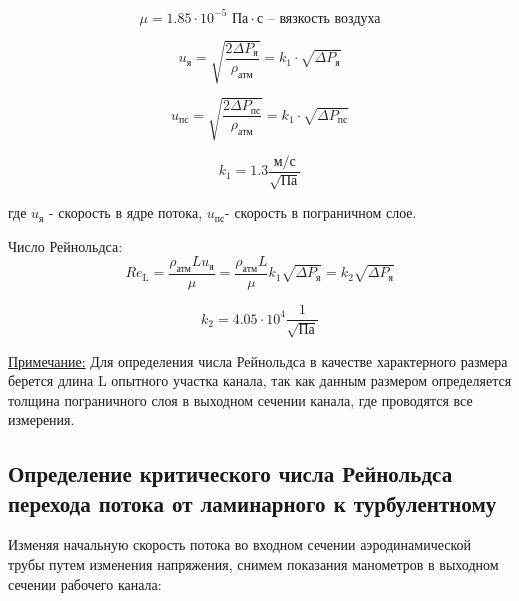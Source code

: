 \documentclass[a4paper]{article}
\begin{document}
$$ \mu = 1.85 \cdot 10^{-5} \text{ Па} \cdot \text{с} \text{ -- вязкость воздуха} $$


$$u_{\text{я}} = \sqrt{\frac{2\Delta P_{\text{я}}}{\rho_{\text{атм}}}} = k_1 \cdot \sqrt{\Delta P_\text{я}}$$

$$u_{\text{пс}} = \sqrt{\frac{2\Delta P_{\text{пс}}}{\rho_{\text{атм}}}} = k_1 \cdot \sqrt{\Delta P_\text{пс}} $$

$$ k_1 = 1.3 \frac{\text{м/с}}{\sqrt{\text{Па}}} $$ 

где $u_\text{я}$ - скорость в ядре потока, $u_\text{пс}$- скорость в пограничном слое.

\vspace{0.5cm}

Число Рейнольдса:
$$Re_\text{L} = \frac{\rho_\text{атм} L u_\text{я}}{\mu} = \frac{\rho_\text{атм} L}{\mu} k_1 \sqrt{\Delta P_\text{я}} = k_2 \sqrt{\Delta P_\text{я}}$$

$$ k_2 = 4.05 \cdot 10^4 \frac{1}{\sqrt{\text{Па}}} $$


\underline{Примечание:}
Для определения числа Рейнольдса в качестве характерного размера берется длина L опытного участка канала, так как данным размером определяется толщина пограничного слоя в выходном сечении канала, где проводятся все измерения.


\newpage

\subsection*{Определение критического числа Рейнольдса перехода потока от ламинарного к турбулентному}

Изменяя начальную скорость потока во входном сечении аэродинамической трубы путем изменения напряжения, снимем показания манометров в выходном сечении рабочего канала:
\end{document}

